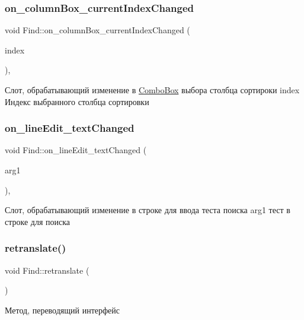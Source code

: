 \subsubsection{\texorpdfstring{on\_columnBox\_currentIndexChanged}{on\_columnBox\_currentIndexChanged}}
{\footnotesize\ttfamily void Find\+::on\+\_\+column\+Box\+\_\+current\+Index\+Changed (\begin{DoxyParamCaption}\item[{int}]{index }\end{DoxyParamCaption})\hspace{0.3cm}{\ttfamily [private]}, {\ttfamily [slot]}}

Слот, обрабатывающий изменение в \mbox{\hyperlink{class_combo_box}{Combo\+Box}} выбора столбца сортироки index Индекс выбранного столбца сортировки \mbox{\label{class_find_a4fe6e569e642cd268783ddc8746d665d}} 
\subsubsection{\texorpdfstring{on\_lineEdit\_textChanged}{on\_lineEdit\_textChanged}}
{\footnotesize\ttfamily void Find\+::on\+\_\+line\+Edit\+\_\+text\+Changed (\begin{DoxyParamCaption}\item[{const Q\+String \&}]{arg1 }\end{DoxyParamCaption})\hspace{0.3cm}{\ttfamily [private]}, {\ttfamily [slot]}}

Слот, обрабатывающий изменение в строке для ввода теста поиска arg1 тест в строке для поиска \mbox{\label{class_find_ab9019aa36b83abe6380262c882b505ee}} 
\subsubsection{\texorpdfstring{retranslate()}{retranslate()}}
{\footnotesize\ttfamily void Find\+::retranslate (\begin{DoxyParamCaption}{ }\end{DoxyParamCaption})}

Метод, переводящий интерфейс \mbox{\label{class_find_a0894546da6a6c364ee15199f243e28aa}} 
